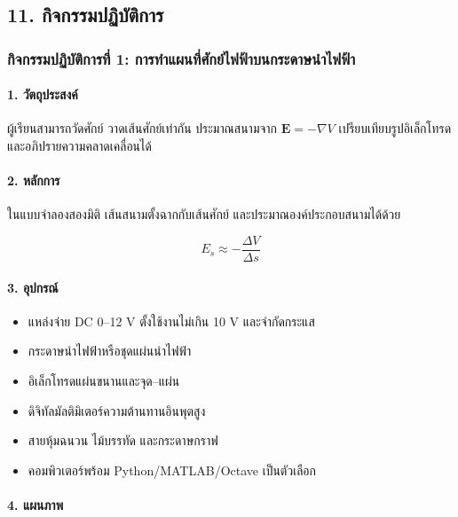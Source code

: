 \newpage

\subsection{11. กิจกรรมปฏิบัติการ}

\subsubsection{กิจกรรมปฏิบัติการที่ 1: การทำแผนที่ศักย์ไฟฟ้าบนกระดาษนำไฟฟ้า}

\paragraph{1. วัตถุประสงค์}

ผู้เรียนสามารถวัดศักย์ วาดเส้นศักย์เท่ากัน ประมาณสนามจาก \(\mathbf{E}=-\nabla V\) เปรียบเทียบรูปอิเล็กโทรด และอภิปรายความคลาดเคลื่อนได้

\paragraph{2. หลักการ}

ในแบบจำลองสองมิติ เส้นสนามตั้งฉากกับเส้นศักย์ และประมาณองค์ประกอบสนามได้ด้วย

\[
E_s\approx-\frac{\Delta V}{\Delta s}
\]

\paragraph{3. อุปกรณ์}

\begin{itemize}
\item แหล่งจ่าย DC 0--12 V ตั้งใช้งานไม่เกิน 10 V และจำกัดกระแส
\item กระดาษนำไฟฟ้าหรือชุดแผ่นนำไฟฟ้า
\item อิเล็กโทรดแผ่นขนานและจุด--แผ่น
\item ดิจิทัลมัลติมิเตอร์ความต้านทานอินพุตสูง
\item สายหุ้มฉนวน ไม้บรรทัด และกระดาษกราฟ
\item คอมพิวเตอร์พร้อม Python/MATLAB/Octave เป็นตัวเลือก
\end{itemize}

\paragraph{4. แผนภาพ}

